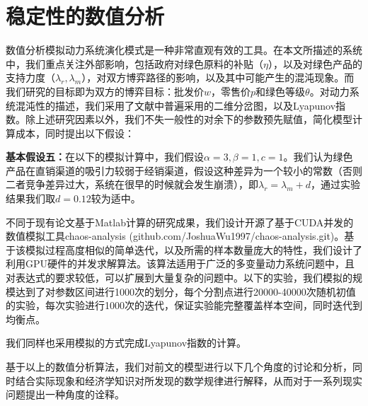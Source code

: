 \documentclass{article}
\begin{document}
\section{稳定性的数值分析}
\par 数值分析模拟动力系统演化模式是一种非常直观有效的工具。在本文所描述的系统中，我们重点关注外部影响，包括政府对绿色原料的补贴（$\eta$），以及对绿色产品的支持力度（$\lambda_r, \lambda_m$），对双方博弈路径的影响，以及其中可能产生的混沌现象。而我们研究的目标即为双方的博弈目标：批发价$w$，零售价$p$和绿色等级$\theta$。对动力系统混沌性的描述，我们采用了文献中普遍采用的二维分岔图，以及Lyapunov指数\cite{2017Tang}\cite{2018Zhang}\cite{2015Zhang}\cite{2018Huang}。除上述研究因素以外，我们不失一般性的对余下的参数预先赋值，简化模型计算成本，同时提出以下假设：
\par \textbf{基本假设五：}在以下的模拟计算中，我们假设$\alpha=3, \beta=1, c=1$。我们认为绿色产品在直销渠道的吸引力较弱于经销渠道，假设这种差异为一个较小的常数（否则二者竞争差异过大，系统在很早的时候就会发生崩溃），即$\lambda_r=\lambda_m+d$，通过实验结果我们取$d=0.12$较为适中。
\par 不同于现有论文基于Matlab计算的研究成果，我们设计开源了基于CUDA并发的数值模拟工具chaos-analysis (github.com/JoshuaWu1997/chaos-analysis.git)。基于该模拟过程高度相似的简单迭代，以及所需的样本数量庞大的特性，我们设计了利用GPU硬件的并发求解算法。该算法适用于广泛的多变量动力系统问题中，且对表达式的要求较低，可以扩展到大量复杂的问题中。以下的实验，我们模拟的规模达到了对参数区间进行1000次的划分，每个分割点进行20000-40000次随机初值的实验，每次实验进行1000次的迭代，保证实验能完整覆盖样本空间，同时迭代到均衡点。
\par 我们同样也采用模拟的方式完成Lyapunov指数的计算。
\par 基于以上的数值分析算法，我们对前文的模型进行以下几个角度的讨论和分析，同时结合实际现象和经济学知识对所发现的数学规律进行解释，从而对于一系列现实问题提出一种角度的诠释。
\end{document}

